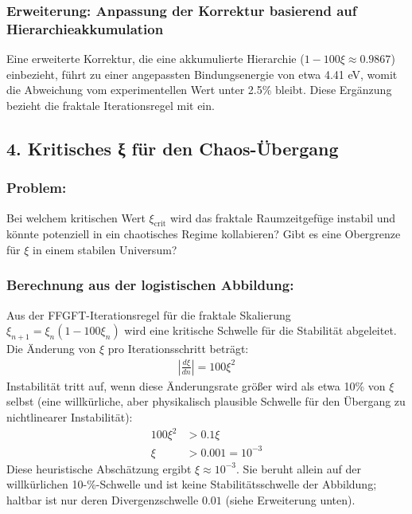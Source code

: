 \subsubsection*{Erweiterung: Anpassung der Korrektur basierend auf Hierarchieakkumulation}
Eine erweiterte Korrektur, die eine akkumulierte Hierarchie ($1 - 100 \xi \approx 0.9867$) einbezieht, führt zu einer angepassten Bindungsenergie von etwa 4.41 eV, womit die Abweichung vom experimentellen Wert unter 2.5\% bleibt. Diese Ergänzung bezieht die fraktale Iterationsregel mit ein.

\subsection*{4. Kritisches ξ für den Chaos-Übergang}

\subsubsection*{Problem:}
Bei welchem kritischen Wert $\xi_{\text{crit}}$ wird das fraktale Raumzeitgefüge instabil und könnte potenziell in ein chaotisches Regime kollabieren? Gibt es eine Obergrenze für $\xi$ in einem stabilen Universum?

\subsubsection*{Berechnung aus der logistischen Abbildung:}

Aus der FFGFT-Iterationsregel für die fraktale Skalierung $\xi_{n+1} = \xi_n (1 - 100\xi_n)$ wird eine kritische Schwelle für die Stabilität abgeleitet. Die Änderung von $\xi$ pro Iterationsschritt beträgt:
\begin{align*}
	\left|\frac{d\xi}{dn}\right| = 100\xi^2
\end{align*}
Instabilität tritt auf, wenn diese Änderungsrate größer wird als etwa 10\% von $\xi$ selbst (eine willkürliche, aber physikalisch plausible Schwelle für den Übergang zu nichtlinearer Instabilität):
\begin{align*}
	100\xi^2 &> 0.1\xi \\
	\xi &> 0.001 = 10^{-3}
\end{align*}
Diese heuristische Abschätzung ergibt $\xi \approx 10^{-3}$. Sie beruht allein auf der willkürlichen 10-\%-Schwelle und ist keine Stabilitätsschwelle der Abbildung; haltbar ist nur deren Divergenzschwelle $0.01$ (siehe Erweiterung unten).

